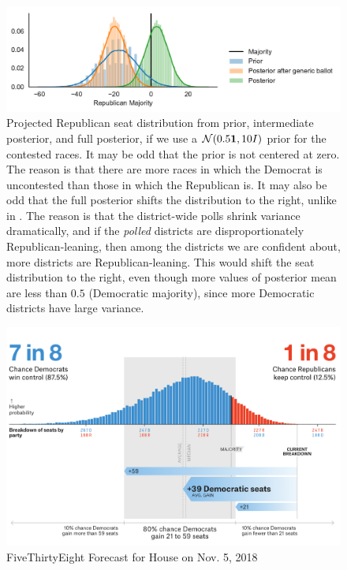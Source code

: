 \documentclass[12pt, letterpaper]{article}
\begin{document}
\begin{figure}[tbh]
  \centering
  \includegraphics[width=\textwidth]{rep_seats_with_diffused_prior.pdf}
  \caption{Projected Republican seat distribution from prior, intermediate posterior, and full posterior, if we use a $\mathcal{N}(0.5\bm{1}, 10I)$ prior for the contested races. It may be odd that the prior is not centered at zero. The reason is that there are more races in which the Democrat is uncontested than those in which the Republican is. It may also be odd that the full posterior shifts the distribution to the right, unlike in . The reason is that the district-wide polls shrink variance dramatically, and if the \emph{polled} districts are disproportionately Republican-leaning, then among the districts we are confident about, more districts are Republican-leaning. This would shift the seat distribution to the right, even though more values of posterior mean are less than $0.5$ (Democratic majority), since more Democratic districts have large variance.}
  \label{fig:hists_diffuse}
\end{figure}

\begin{figure}[tbh]
  \centering
  \includegraphics[scale=0.4]{538_hist}
  \caption{FiveThirtyEight Forecast for House on Nov. 5, 2018}
  \label{fig:538_hist}
\end{figure}
\end{document}
